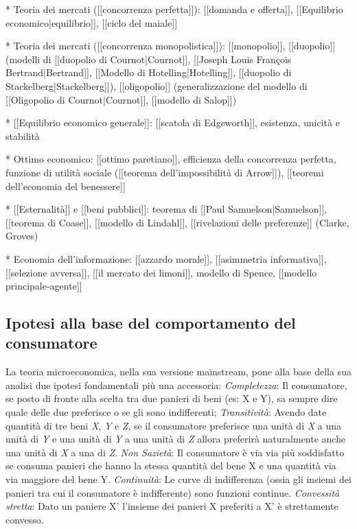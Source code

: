 * Teoria dei mercati ([[concorrenza perfetta]]): [[domanda e offerta]], 
[[Equilibrio economico|equilibrio]], [[ciclo del maiale]]

* Teoria dei mercati ([[concorrenza monopolistica]]): [[monopolio]], 
[[duopolio]] (modelli di [[duopolio di Cournot|Cournot]], [[Joseph Louis 
François Bertrand|Bertrand]], [[Modello di Hotelling|Hotelling]], [[duopolio di 
Stackelberg|Stackelberg]]), [[oligopolio]] (generalizzazione del modello di 
[[Oligopolio di Cournot|Cournot]], [[modello di Salop]])

* [[Equilibrio economico generale]]: [[scatola di Edgeworth]], esistenza, 
unicità e stabilità

* Ottimo economico: [[ottimo paretiano]], efficienza della concorrenza 
perfetta, funzione di utilità sociale ([[teorema dell'impossibilità di 
Arrow]]), [[teoremi dell'economia del benessere]]

* [[Esternalità]] e [[beni pubblici]]: teorema di [[Paul Samuelson|Samuelson]], 
[[teorema di Coase]], [[modello di Lindahl]], [[rivelazioni delle preferenze]] 
(Clarke, Groves)

* Economia dell'informazione: [[azzardo morale]], [[asimmetria informativa]], 
[[selezione avversa]], [[il mercato dei limoni]], modello di Spence, [[modello 
principale-agente]]

\subsection{Ipotesi alla base del comportamento del consumatore}

La teoria microeconomica, nella sua versione mainstream, pone alla base della 
sua analisi due ipotesi fondamentali più una accessoria:
\emph{Completezza}: Il consumatore, se posto di fronte alla scelta tra due 
panieri di beni (es: X e Y), sa sempre dire quale delle due preferisce o se gli 
sono indifferenti;
\emph{Transitività}: Avendo date quantità di tre beni \emph{X}, \emph{Y} 
e \emph{Z}, se il consumatore preferisce una unità di \emph{X} a una unità 
di \emph{Y} e una unità di \emph{Y} a una unità di \emph{Z} allora preferirà 
naturalmente anche una unità di \emph{X} a una di \emph{Z}.
\emph{Non Sazietà}: Il consumatore è via via più soddisfatto se consuma 
panieri che hanno la stessa quantità del bene X e una quantità via via maggiore 
del bene Y.
\emph{Continuità}: Le curve di indifferenza (ossia gli insiemi dei panieri 
tra cui il consumatore è indifferente) sono funzioni continue.
\emph{Convessità stretta}: Dato un paniere X' l'insieme dei panieri X 
preferiti a X' è strettamente convesso.

